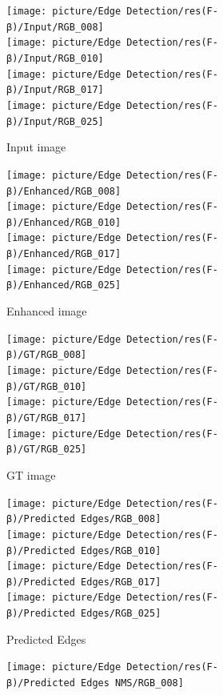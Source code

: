 \documentclass[a4paper]{ctexart}
\begin{document}
	\begin{figure}[htbp]
		\centering
		\begin{subfigure}{0.16\textwidth}
			\texttt{[image: picture/Edge Detection/res(F-β)/Input/RGB\_008]} \\
			\texttt{[image: picture/Edge Detection/res(F-β)/Input/RGB\_010]} \\
			\texttt{[image: picture/Edge Detection/res(F-β)/Input/RGB\_017]} \\
			\texttt{[image: picture/Edge Detection/res(F-β)/Input/RGB\_025]}
			\caption{Input image}
			\label{fig: Input}
		\end{subfigure}
		\begin{subfigure}{0.16\textwidth}
			\texttt{[image: picture/Edge Detection/res(F-β)/Enhanced/RGB\_008]} \\
			\texttt{[image: picture/Edge Detection/res(F-β)/Enhanced/RGB\_010]} \\
			\texttt{[image: picture/Edge Detection/res(F-β)/Enhanced/RGB\_017]} \\
			\texttt{[image: picture/Edge Detection/res(F-β)/Enhanced/RGB\_025]}
			\caption{Enhanced image}
			\label{fig: Enhanced}
		\end{subfigure}
		\begin{subfigure}{0.16\textwidth}
			\texttt{[image: picture/Edge Detection/res(F-β)/GT/RGB\_008]} \\
			\texttt{[image: picture/Edge Detection/res(F-β)/GT/RGB\_010]} \\
			\texttt{[image: picture/Edge Detection/res(F-β)/GT/RGB\_017]} \\
			\texttt{[image: picture/Edge Detection/res(F-β)/GT/RGB\_025]}
			\caption{GT image}
			\label{fig: GT image}
		\end{subfigure}
		\begin{subfigure}{0.16\textwidth}
			\texttt{[image: picture/Edge Detection/res(F-β)/Predicted Edges/RGB\_008]} \\
			\texttt{[image: picture/Edge Detection/res(F-β)/Predicted Edges/RGB\_010]} \\
			\texttt{[image: picture/Edge Detection/res(F-β)/Predicted Edges/RGB\_017]} \\
			\texttt{[image: picture/Edge Detection/res(F-β)/Predicted Edges/RGB\_025]}
			\caption{Predicted Edges}
			\label{fig: Predicted Edges}
		\end{subfigure}
		\begin{subfigure}{0.16\textwidth}
			\texttt{[image: picture/Edge Detection/res(F-β)/Predicted Edges NMS/RGB\_008]} \\

\end{subfigure}
\end{figure}
\end{document}
